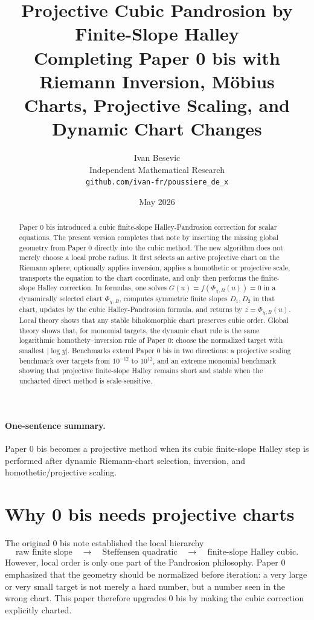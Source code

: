 \documentclass[11pt]{article}
\title{Projective Cubic Pandrosion by Finite-Slope Halley\\\large Completing Paper 0 bis with Riemann Inversion, Möbius Charts, Projective Scaling, and Dynamic Chart Changes}
\author{Ivan Besevic\\Independent Mathematical Research\\\texttt{github.com/ivan-fr/poussiere\_de\_x}}
\date{May 2026}
\theoremstyle{definition}
\begin{document}
\maketitle

\begin{abstract}
Paper 0 bis introduced a cubic finite-slope Halley-Pandrosion correction for scalar equations. The present version completes that note by inserting the missing global geometry from Paper 0 directly into the cubic method. The new algorithm does not merely choose a local probe radius. It first selects an active projective chart on the Riemann sphere, optionally applies inversion, applies a homothetic or projective scale, transports the equation to the chart coordinate, and only then performs the finite-slope Halley correction. In formulas, one solves $G(u)=f(\Phi_{\chi,B}(u))=0$ in a dynamically selected chart $\Phi_{\chi,B}$, computes symmetric finite slopes $D_1,D_2$ in that chart, updates by the cubic Halley-Pandrosion formula, and returns by $z=\Phi_{\chi,B}(u)$. Local theory shows that any stable biholomorphic chart preserves cubic order. Global theory shows that, for monomial targets, the dynamic chart rule is the same logarithmic homothety--inversion rule of Paper 0: choose the normalized target with smallest $|\log y|$. Benchmarks extend Paper 0 bis in two directions: a projective scaling benchmark over targets from $10^{-12}$ to $10^{12}$, and an extreme monomial benchmark showing that projective finite-slope Halley remains short and stable when the uncharted direct method is scale-sensitive.
\end{abstract}

\paragraph{One-sentence summary.} Paper 0 bis becomes a projective method when its cubic finite-slope Halley step is performed after dynamic Riemann-chart selection, inversion, and homothetic/projective scaling.

\section{Why 0 bis needs projective charts}
The original 0 bis note established the local hierarchy
\[
\text{raw finite slope} \quad\longrightarrow\quad \text{Steffensen quadratic} \quad\longrightarrow\quad \text{finite-slope Halley cubic}.
\]
However, local order is only one part of the Pandrosion philosophy. Paper 0 emphasized that the geometry should be normalized before iteration: a very large or very small target is not merely a hard number, but a number seen in the wrong chart. This paper therefore upgrades 0 bis by making the cubic correction explicitly charted.
\end{document}
